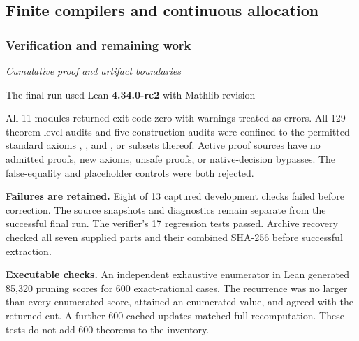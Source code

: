 \subsection{Finite compilers and continuous allocation}\label{sec:history-2}


\subsubsection*{Verification and remaining work}\label{history:supp2:subsection:007}\textit{Cumulative proof and artifact boundaries}\par
The final run used Lean \textbf{4.34.0-rc2} with Mathlib revision
\begin{center}\end{center}
All 11 modules returned exit code zero with warnings treated as errors. All 129 theorem-level audits and five construction audits were confined to the permitted standard axioms , , and , or subsets thereof. Active proof sources have no admitted proofs, new axioms, unsafe proofs, or native-decision bypasses. The false-equality and placeholder controls were both rejected.

\textbf{Failures are retained.} Eight of 13 captured development checks failed before correction. The source snapshots and diagnostics remain separate from the successful final run. The verifier's 17 regression tests passed. Archive recovery checked all seven supplied parts and their combined SHA-256 before successful extraction.

\textbf{Executable checks.} An independent exhaustive enumerator in Lean generated 85,320 pruning scores for 600 exact-rational cases. The recurrence was no larger than every enumerated score, attained an enumerated value, and agreed with the returned cut. A further 600 cached updates matched full recomputation. These tests do not add 600 theorems to the inventory.

